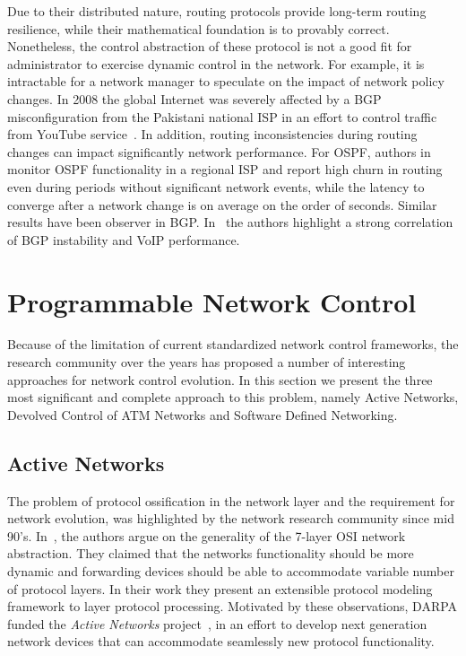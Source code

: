 Due to their distributed nature, routing protocols provide long-term routing
resilience, while their mathematical foundation is to provably correct.
Nonetheless, the control abstraction of these protocol is not a good fit for
administrator to exercise dynamic control in the network. For example, it is
intractable for a network manager to speculate on the impact of network policy
changes.  In 2008 the global Internet was severely affected by a BGP
misconfiguration from the Pakistani national ISP in an effort to control traffic
from YouTube service~\cite{bgp_config_error}.  In addition,
routing inconsistencies during routing changes can impact significantly network
performance.  For OSPF, authors in~\cite{Watson2003} monitor OSPF functionality
in a regional ISP and report high churn in routing even during periods without
significant network events, while the latency to converge after a network change
is on average on the order of seconds. Similar results have been observer in
BGP\@. In~\cite{Kushman2007} the authors highlight a strong correlation of BGP
instability and VoIP performance. 

\section{Programmable Network Control}

Because of the limitation of current standardized network control frameworks,
the research community over the years has proposed a number of interesting
approaches for network control evolution. In this section we present the three
most significant and complete approach to this problem, namely Active Networks,
Devolved Control of ATM Networks and Software Defined Networking. 

\subsection{Active Networks}

The problem of protocol ossification in the network layer and the requirement
for network evolution, was highlighted  by the network research community since
mid 90's. In~\cite{O'Malley1992}, the authors argue on the generality of the
7-layer OSI network abstraction. They claimed that the networks functionality
should be more dynamic and forwarding devices should be able to accommodate
variable number of protocol layers. In their work they present an extensible
protocol modeling framework to layer protocol processing. Motivated by these
observations, DARPA funded the \emph{Active Networks}
project~\cite{darpa_active_net}, in an effort to develop next generation network
devices that can accommodate seamlessly new protocol functionality. 

